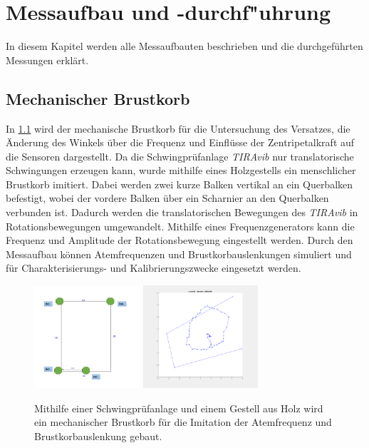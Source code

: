 
\lhead[\chaptername~\thechapter]{\rightmark}


\rhead[\leftmark]{}


\lfoot[\thepage]{}


\cfoot{}


\rfoot[]{\thepage}


\chapter{Messaufbau und -durchf"uhrung}
In diesem Kapitel werden alle Messaufbauten beschrieben und die durchgeführten Messungen erklärt. 

\section{Mechanischer Brustkorb}
In \ref{img:mech-bruskorb} wird der mechanische Brustkorb für die Untersuchung des Versatzes, die Änderung des Winkels über die Frequenz und Einflüsse der Zentripetalkraft auf die Sensoren dargestellt. Da die Schwingprüfanlage \textit{TIRAvib} nur translatorische Schwingungen erzeugen kann, wurde mithilfe eines Holzgestells ein menschlicher Brustkorb imitiert. Dabei werden zwei kurze Balken vertikal an ein Querbalken befestigt, wobei der vordere Balken über ein Scharnier an den Querbalken verbunden ist. Dadurch werden die translatorischen Bewegungen des \textit{TIRAvib} in Rotationsbewegungen umgewandelt. Mithilfe eines Frequenzgenerators kann die Frequenz und Amplitude der Rotationsbewegung eingestellt werden. Durch den Messaufbau können Atemfrequenzen und Brustkorbauslenkungen simuliert und für Charakterisierungs- und Kalibrierungszwecke eingesetzt werden.

\begin{figure}
	\centering
	\includegraphics[width=0.35\textwidth]{images/mechBrustkorb}
	\includegraphics[width=0.38\textwidth]{images/mechBrustkorb2.PNG}
	\caption[Mechanischer Brustkorb]{Mithilfe einer Schwingprüfanlage und einem Gestell aus Holz wird ein mechanischer Brustkorb für die Imitation der Atemfrequenz und Brustkorbauslenkung gebaut.}
	\label{img:mech-bruskorb}
\end{figure}


